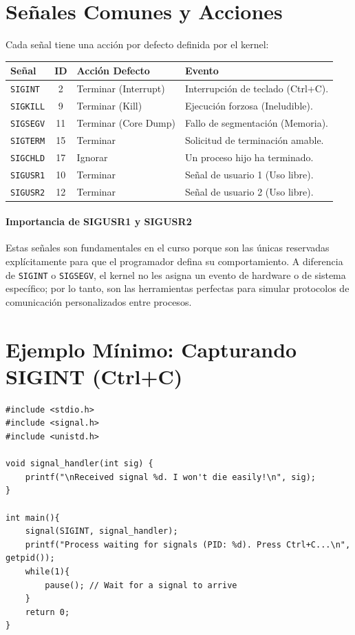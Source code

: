 \documentclass[12pt,a4paper]{article}
\begin{document}
\section{Señales Comunes y Acciones}
Cada señal tiene una acción por defecto definida por el kernel:
\begin{table}[h]
\centering
\small
\begin{tabular}{|l|c|l|l|}
\hline
\textbf{Señal} & \textbf{ID} & \textbf{Acción Defecto} & \textbf{Evento} \\ \hline
\texttt{SIGINT} & 2 & Terminar (Interrupt) & Interrupción de teclado (Ctrl+C). \\ \hline
\texttt{SIGKILL} & 9 & Terminar (Kill) & Ejecución forzosa (Ineludible). \\ \hline
\texttt{SIGSEGV} & 11 & Terminar (Core Dump) & Fallo de segmentación (Memoria). \\ \hline
\texttt{SIGTERM} & 15 & Terminar & Solicitud de terminación amable. \\ \hline
\texttt{SIGCHLD} & 17 & Ignorar & Un proceso hijo ha terminado. \\ \hline
\texttt{SIGUSR1} & 10 & Terminar & Señal de usuario 1 (Uso libre). \\ \hline
\texttt{SIGUSR2} & 12 & Terminar & Señal de usuario 2 (Uso libre). \\ \hline
\end{tabular}
\end{table}

\paragraph{Importancia de SIGUSR1 y SIGUSR2}
Estas señales son fundamentales en el curso porque son las únicas reservadas explícitamente para que el programador defina su comportamiento. A diferencia de \texttt{SIGINT} o \texttt{SIGSEGV}, el kernel no les asigna un evento de hardware o de sistema específico; por lo tanto, son las herramientas perfectas para simular protocolos de comunicación personalizados entre procesos.

\newpage

\section{Ejemplo Mínimo: Capturando SIGINT (Ctrl+C)}
\begin{lstlisting}
#include <stdio.h>
#include <signal.h>
#include <unistd.h>

void signal_handler(int sig) {
    printf("\nReceived signal %d. I won't die easily!\n", sig);
}

int main(){
    signal(SIGINT, signal_handler);
    printf("Process waiting for signals (PID: %d). Press Ctrl+C...\n", getpid());
    while(1){
        pause(); // Wait for a signal to arrive
    }
    return 0;
}
\end{lstlisting}
\end{document}
